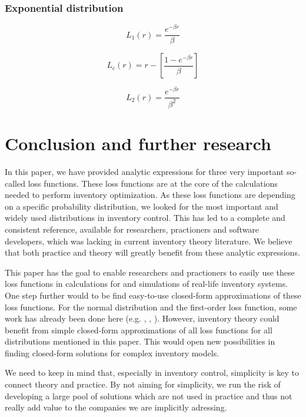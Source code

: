 \documentclass{article}
\begin{document}
\subsubsection{Exponential distribution}

\begin{equation}
    L_1(r) = \frac{e^{-\beta r}}{\beta}
\end{equation}

\begin{equation}
    L_c(r) = r-\left[\frac{1-e^{-\beta r}}{\beta}\right]
\end{equation}

\begin{equation}
    L_2(r) = \frac{e^{-\beta r}}{\beta^2}
\end{equation}

\section{Conclusion and further research}
\begin{flushleft}
    In this paper, we have provided analytic expressions for three very important so-called loss functions.
    These loss functions are at the core of the calculations needed to perform inventory optimization.
    As these loss functions are depending on a specific probability distribution, we looked for the most important and widely used distributions in inventory control.
    This has led to a complete and consistent reference, available for researchers, practioners and software developers, which was lacking in current inventory theory literature.
    We believe that both practice and theory will greatly benefit from these analytic expressions.
\end{flushleft}
\begin{flushleft}
    This paper has the goal to enable researchers and practioners to easily use these loss functions in calculations for and simulations of real-life inventory systems.
    One step further would to be find easy-to-use closed-form approximations of these loss functions.
    For the normal distribution and the first-order loss function, some work has already been done here (e.g. \cite{DESCHRIJVER20121375}, \cite{Rossi_2014}, \cite{200fda1f-f795-3a50-b422-4d66e1cfba96}).
    However, inventory theory could benefit from simple closed-form approximations of all loss functions for all distributions mentioned in this paper. This would open new possibilities in finding closed-form solutions for complex inventory models.
\end{flushleft}
\begin{flushleft}
    We need to keep in mind that, especially in inventory control, simplicity is key to connect theory and practice.
    By not aiming for simplicity, we run the risk of developing a large pool of solutions which are not used in practice and thus not really add value to the companies we are implicitly adressing.
\end{flushleft}


\end{document}
